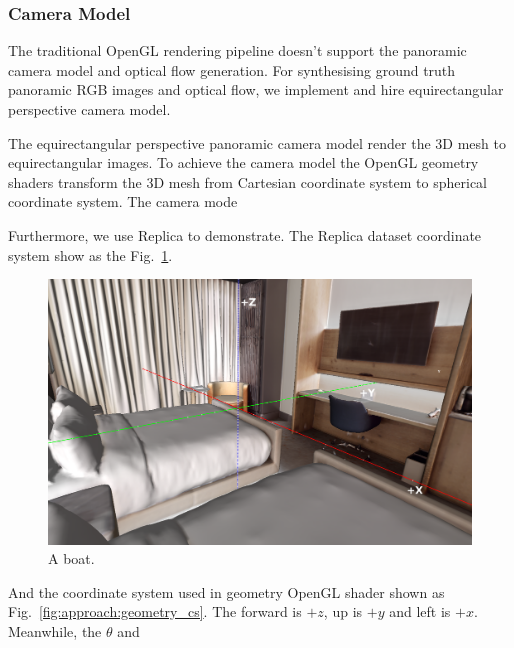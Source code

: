 \subsubsection{Camera Model}

The traditional OpenGL rendering pipeline doesn't support the panoramic camera model and optical flow generation.
For synthesising ground truth panoramic RGB images and optical flow, we implement and hire equirectangular perspective camera model.

The equirectangular perspective panoramic camera model render the 3D mesh to  equirectangular images.
To achieve the camera model the OpenGL geometry shaders transform the 3D mesh from Cartesian coordinate system to spherical coordinate system. 
The camera mode

Furthermore, we use Replica to demonstrate. 
The Replica dataset coordinate system show as the Fig.~\ref{fig:approach:coord_hotel_00}.

\begin{figure}[hbt!]
	\centering
	\includegraphics[width=\linewidth]{images/synthetic_optical_flow/coord_hotel_00.png}
	\caption{A boat.}
	\label{fig:approach:coord_hotel_00}
\end{figure}

And the coordinate system used in geometry OpenGL shader shown as Fig.~\ref{fig:approach:geometry_cs}.
The forward is $+z$, up is $+y$ and left is $+x$.
Meanwhile, the $\theta$ and 

